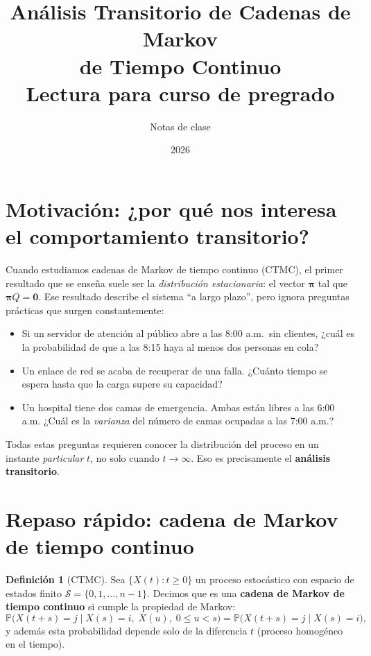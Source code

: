 \documentclass[11pt,a4paper]{article}
\title{%
  \textbf{Análisis Transitorio de Cadenas de Markov\\
  de Tiempo Continuo}\\[6pt]
  \large Lectura para curso de pregrado
}
\author{Notas de clase}
\date{2026}
\theoremstyle{definition}
\newtheorem{definicion}{Definición}[section]
\theoremstyle{remark}
\newcommand{\Prob}{\mathbb{P}}
\begin{document}
\maketitle

\tableofcontents
\newpage

\section{Motivación: ¿por qué nos interesa el comportamiento transitorio?}

Cuando estudiamos cadenas de Markov de tiempo continuo (CTMC), el primer
resultado que se enseña suele ser la \emph{distribución estacionaria}: el
vector $\boldsymbol{\pi}$ tal que $\boldsymbol{\pi}Q = \mathbf{0}$.  Ese
resultado describe el sistema ``a largo plazo'', pero ignora preguntas
prácticas que surgen constantemente:

\begin{itemize}[nosep]
  \item Si un servidor de atención al público abre a las 8:00 a.m.\ sin
        clientes, ¿cuál es la probabilidad de que a las 8:15 haya al menos
        dos personas en cola?
  \item Un enlace de red se acaba de recuperar de una falla.  ¿Cuánto
        tiempo se espera hasta que la carga supere su capacidad?
  \item Un hospital tiene dos camas de emergencia.  Ambas están libres a
        las 6:00 a.m.  ¿Cuál es la \emph{varianza} del número de camas
        ocupadas a las 7:00 a.m.?
\end{itemize}

Todas estas preguntas requieren conocer la distribución del proceso en un
instante \emph{particular} $t$, no solo cuando $t\to\infty$.  Eso es
precisamente el \textbf{análisis transitorio}.

\section{Repaso rápido: cadena de Markov de tiempo continuo}

\begin{definicion}[CTMC]
Sea $\{X(t) : t \ge 0\}$ un proceso estocástico con espacio de estados
finito $\mathcal{S} = \{0,1,\dots,n-1\}$.  Decimos que es una
\textbf{cadena de Markov de tiempo continuo} si cumple la propiedad de
Markov:
\[
  \Prob\bigl(X(t+s) = j \mid X(s) = i,\; X(u),\; 0 \le u < s\bigr)
  = \Prob\bigl(X(t+s) = j \mid X(s) = i\bigr),
\]
y además esta probabilidad depende solo de la diferencia $t$ (proceso
homogéneo en el tiempo).
\end{definicion}
\end{document}
